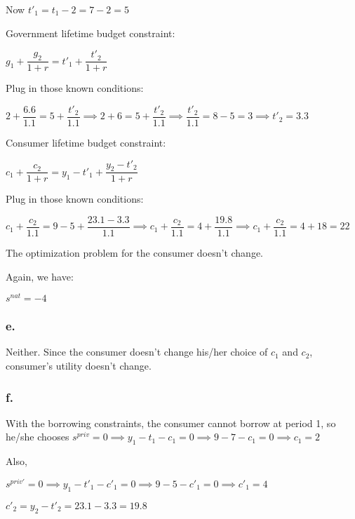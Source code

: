\documentclass{article}
\begin{document}
Now $t'_{1}=t_{1}-2=7-2=5$

Government lifetime budget constraint:

$g_{1}+\dfrac{g_{2}}{1+r}=t'_{1}+\dfrac{t'_{2}}{1+r}$

Plug in those known conditions:

$2+\dfrac{6.6}{1.1}=5+\dfrac{t'_{2}}{1.1}\implies2+6=5+\dfrac{t'_{2}}{1.1}\implies\dfrac{t'_{2}}{1.1}=8-5=3\implies\boxed{t'_{2}=3.3}$

Consumer lifetime budget constraint:

$c_{1}+\dfrac{c_{2}}{1+r}=y_{1}-t'_{1}+\dfrac{y_{2}-t'_{2}}{1+r}$

Plug in those known conditions:

$c_{1}+\dfrac{c_{2}}{1.1}=9-5+\dfrac{23.1-3.3}{1.1}\implies c_{1}+\dfrac{c_{2}}{1.1}=4+\dfrac{19.8}{1.1}\implies c_{1}+\dfrac{c_{2}}{1.1}=4+18=22$

The optimization problem for the consumer doesn't change.

Again, we have:

\begin{spacing}{1}
\end{spacing}

$\boxed{s^{nat}=-4}$

\subsubsection*{\textrm{e.}}

Neither. Since the consumer doesn't change his/her choice of $c_{1}$ and $c_{2}$, consumer's utility doesn't change.

\subsubsection*{\textrm{f.}}

With the borrowing constraints, the consumer cannot borrow at period 1, so he/she chooses 
$s^{priv}=0\implies y_{1}-t_{1}-c_{1}=0\implies9-7-c_{1}=0\implies \boxed{c_{1}=2}$

Also,

$s^{priv\prime}=0\implies y_{1}-t'_{1}-c'_{1}=0\implies9-5-c'_{1}=0\implies \boxed{c'_{1}=4}$

$c'_{2}=y_{2}-t'_{2}=23.1-3.3=\boxed{19.8}$
\end{document}
